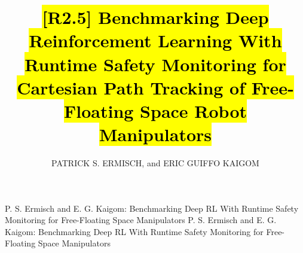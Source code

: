 \documentclass{ieeeaccess}
\newcommand{\hlone}[1]{{\sethlcolor{rone}\hl{#1}}}
\begin{document}

\title{\hlone{[R2.5] Benchmarking Deep Reinforcement Learning With Runtime Safety Monitoring for Cartesian Path Tracking of Free-Floating Space Robot Manipulators}}
\author{\uppercase{Patrick S. Ermisch}, and 
\uppercase{Eric Guiffo Kaigom} }
\address[1]{Department of Computer Science \& Engineering, Frankfurt University of Applied Sciences,
Frankfurt am Main, Germany \\(e-mail: patrick.ermisch@proton.me, kaigom@fra-uas.de)}

\markboth
{P. S. Ermisch and E. G. Kaigom: Benchmarking Deep RL With Runtime Safety Monitoring for Free-Floating Space Manipulators}
{P. S. Ermisch and E. G. Kaigom: Benchmarking Deep RL With Runtime Safety Monitoring for Free-Floating Space Manipulators}

\end{document}
